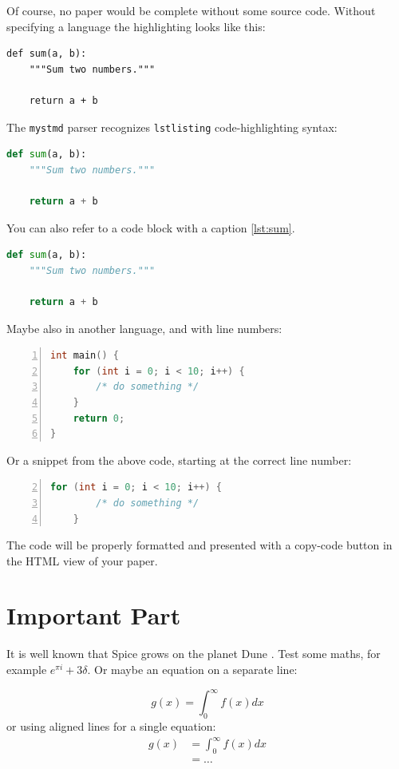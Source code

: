 Of course, no paper would be complete without some source code.
Without specifying a language the highlighting looks like this:

\begin{verbatim}
def sum(a, b):
    """Sum two numbers."""

    return a + b
\end{verbatim}

The \texttt{mystmd} parser recognizes \texttt{lstlisting} code-highlighting syntax:

\begin{lstlisting}[language=Python]
def sum(a, b):
    """Sum two numbers."""

    return a + b
\end{lstlisting}
You can also refer to a code block with a caption \autoref{lst:sum}.
\begin{lstlisting}[label=lst:sum,language=Python,caption=Example Python Code]
def sum(a, b):
    """Sum two numbers."""

    return a + b
\end{lstlisting}
Maybe also in another language, and with line numbers:
\begin{lstlisting}[language=c,numbers=left]
int main() {
    for (int i = 0; i < 10; i++) {
        /* do something */
    }
    return 0;
}
\end{lstlisting}

Or a snippet from the above code, starting at the correct line number:

\begin{lstlisting}[language=c,numbers=left,firstnumber=2]
    for (int i = 0; i < 10; i++) {
        /* do something */
    }
\end{lstlisting}

The code will be properly formatted and presented with a copy-code button in the HTML view of your paper.

\section{Important Part}\label{important-part}

It is well known that Spice grows on the planet Dune \citep{Atr03}.
Test some maths, for example $e^{\pi i} + 3 \delta$.
Or maybe an equation on a separate line:

\begin{equation*}
    g(x) = \int_0^\infty f(x) dx
\end{equation*}
or using aligned lines for a single equation:
\begin{equation}
\begin{aligned}
    g(x) &= \int_0^\infty f(x) dx \\
         &= \ldots
\end{aligned}
\end{equation}

